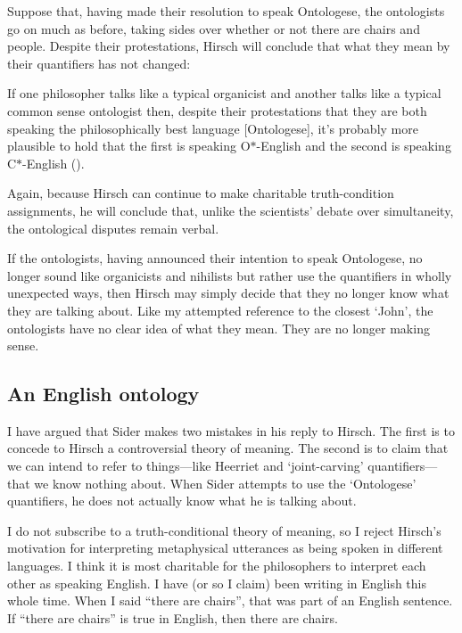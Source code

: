 \documentclass[11pt]{article}
\newenvironment{squote}{%
\begin{spacing}{1}
       	\begin{list}{}{%
\setlength{\labelwidth}{0pt}%
\rightmargin\leftmargin%
}
\item\relax
}{%
\end{list}%
\end{spacing}
}
\begin{document}
\begin{spacing}{1.25}
Suppose that, having made their resolution to speak Ontologese, the
ontologists go on much as before, taking sides over whether or not
there are chairs and people.  Despite their protestations, Hirsch will
conclude that what they mean by their quantifiers has not changed:

\begin{squote}
If one philosopher talks like a typical organicist and another talks
like a typical common sense ontologist then, despite their
protestations that they are both speaking the philosophically best
language [Ontologese], it's probably more plausible to hold that the
first is speaking O$\ast$-English and the second is speaking
C$\ast$-English (\citeyear[12]{hirsch2008}).
\end{squote}

Again, because Hirsch can continue to make charitable truth-condition
assignments, he will conclude that, unlike the scientists' debate over
simultaneity, the ontological disputes remain verbal.

If the ontologists, having announced their intention to speak
Ontologese, no longer sound like organicists and nihilists but rather
use the quantifiers in wholly unexpected ways, then Hirsch may simply
decide that they no longer know what they are talking about.  Like my
attempted reference to the closest `John', the ontologists have no
clear idea of what they mean.  They are no longer making sense.

\subsection{An English ontology}
I have argued that Sider makes two mistakes in his reply to Hirsch.
The first is to concede to Hirsch a controversial theory of meaning.
The second is to claim that we can intend to refer to things---like
Heerriet and `joint-carving' quantifiers---that we know nothing about.
 When Sider attempts to use the `Ontologese' quantifiers, he does not
 actually know what he is talking about.

I do not subscribe to a truth-conditional theory of meaning, so I
reject Hirsch's motivation for interpreting metaphysical utterances as
being spoken in different languages.  I think it is most charitable
for the philosophers to interpret each other as speaking English.  I
have (or so I claim) been writing in English this whole time.  When I
said ``there are chairs'', that was part of an English sentence.  If
``there are chairs'' is true in English, then there are chairs.


\end{spacing}
\end{document}
